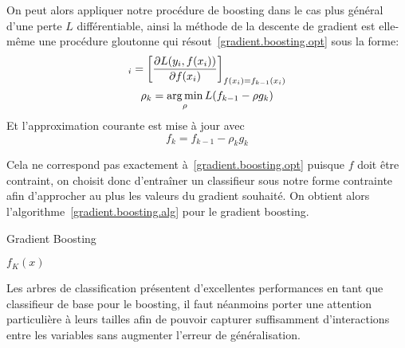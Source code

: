 On peut alors appliquer notre procédure de boosting dans le cas plus général d'une perte $L$ différentiable, ainsi la méthode de la descente de gradient est elle-même une procédure gloutonne qui résout~\ref{gradient.boosting.opt} sous la forme:
\begin{gather}
    [g_k]_i = \left[ \frac{\partial L (y_i , f(x_i) ) }{\partial f(x_i)} \right]_{f(x_i) = f_{k-1} (x_i)} \\
    \rho_k = \argmin_{\rho} L ( f_{k-1} - \rho g_k  )
\end{gather}
Et l'approximation courante est mise à jour avec
\begin{equation*}
    f_k = f_{k-1} - \rho_k g_k
\end{equation*}

Cela ne correspond pas exactement à~\ref{gradient.boosting.opt} puisque $f$ doit être contraint, on choisit donc d'entraîner un classifieur sous notre forme contrainte afin d'approcher au plus les valeurs du gradient souhaité. On obtient alors l'algorithme~\ref{gradient.boosting.alg} pour le gradient boosting.

\begin{algorithm}
\caption{Gradient Boosting} \label{gradient.boosting.alg}
\begin{algorithmic}
    
    
    \EndFor
    \State \Return $f_K (x)$
    \EndProcedure
\end{algorithmic}    
\end{algorithm}

Les arbres de classification présentent d'excellentes performances en tant que classifieur de base pour le boosting, il faut néanmoins porter une attention particulière à leurs tailles afin de pouvoir capturer suffisamment d'interactions entre les variables sans augmenter l'erreur de généralisation.

